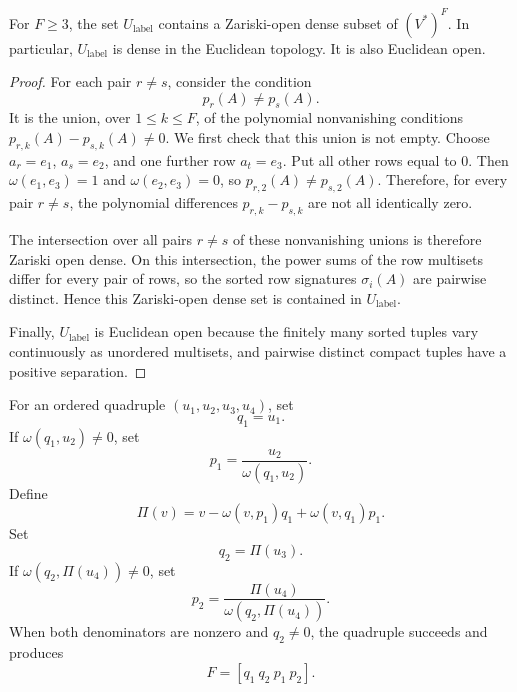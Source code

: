 \begin{lemma}
\label{lem:generic-coordinate-labeling-open-dense}
For \(F\ge 3\), the set \(U_{\mathrm{label}}\) contains a Zariski-open dense
subset of \((V^*)^F\). In particular, \(U_{\mathrm{label}}\) is dense in the
Euclidean topology. It is also Euclidean open.
\end{lemma}

\begin{proof}
For each pair \(r\ne s\), consider the condition
\[
  p_r(A)\ne p_s(A).
\]
It is the union, over \(1\le k\le F\), of the polynomial nonvanishing
conditions \(p_{r,k}(A)-p_{s,k}(A)\ne 0\). We first check that this union is not
empty. Choose \(a_r=e_1\), \(a_s=e_2\), and one further row \(a_t=e_3\). Put all
other rows equal to \(0\). Then \(\omega(e_1,e_3)=1\) and
\(\omega(e_2,e_3)=0\), so \(p_{r,2}(A)\ne p_{s,2}(A)\). Therefore, for every
pair \(r\ne s\), the polynomial differences \(p_{r,k}-p_{s,k}\) are not all
identically zero.

The intersection over all pairs \(r\ne s\) of these nonvanishing unions is
therefore Zariski open dense. On this intersection, the power sums of the row
multisets differ for every pair of rows, so the sorted row signatures
\(\sigma_i(A)\) are pairwise distinct. Hence this Zariski-open dense set is
contained in \(U_{\mathrm{label}}\).

Finally, \(U_{\mathrm{label}}\) is Euclidean open because the finitely many
sorted tuples vary continuously as unordered multisets, and pairwise distinct
compact tuples have a positive separation.
\end{proof}

\begin{definition}
\label{def:symplectic-gram-schmidt-quadruple}
For an ordered quadruple \((u_1,u_2,u_3,u_4)\), set
\[
  q_1=u_1.
\]
If \(\omega(q_1,u_2)\ne 0\), set
\[
  p_1=\frac{u_2}{\omega(q_1,u_2)}.
\]
Define
\[
  \Pi(v)=v-\omega(v,p_1)q_1+\omega(v,q_1)p_1.
\]
Set
\[
  q_2=\Pi(u_3).
\]
If \(\omega(q_2,\Pi(u_4))\ne 0\), set
\[
  p_2=\frac{\Pi(u_4)}{\omega(q_2,\Pi(u_4))}.
\]
When both denominators are nonzero and \(q_2\ne 0\), the quadruple succeeds and
produces
\[
  F=[q_1\ q_2\ p_1\ p_2].
\]
\end{definition}

